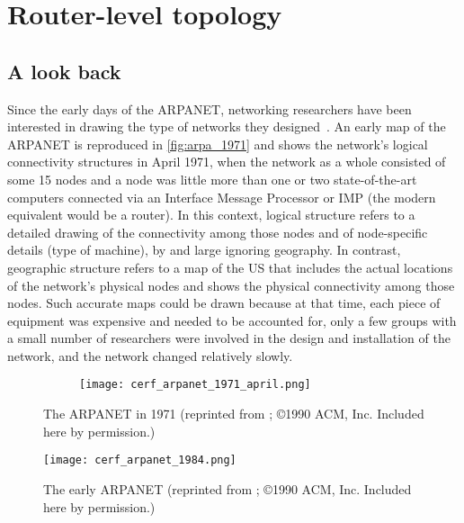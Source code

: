 \section{Router-level topology}
\label{sec:router}

\subsection{A look back}
\label{sec:router_hist}

Since the early days of the ARPANET, networking researchers have been
interested in drawing the type of networks they
designed~\cite{heart78:_arpanet}.  An early map of the ARPANET is
reproduced in \autoref{fig:arpa_1971} and shows the network's logical
connectivity structures in April 1971, when the network as a whole
consisted of some 15 nodes and a node was little more than one or two
state-of-the-art computers connected via an Interface Message
Processor or IMP (the modern equivalent would be a router).  In this
context, logical structure refers to a detailed drawing of the
connectivity among those nodes and of node-specific details (\eg type
of machine), by and large ignoring geography.  In contrast, geographic
structure refers to a map of the US that includes the actual locations
of the network's physical nodes and shows the physical connectivity
among those nodes. Such accurate maps could be drawn because at that
time, each piece of equipment was expensive and needed to be accounted
for, only a few groups with a small number of researchers were
involved in the design and installation of the network, and the
network changed relatively slowly.

\begin{figure}[thbp]
  \begin{center}
    \begin{subfigure}[b]{0.75\textwidth} \centering
      \texttt{[image: cerf\_arpanet\_1971\_april.png]}
    \end{subfigure}
    \caption{The ARPANET in 1971 (reprinted from
      \cite{cerf90:_selected_maps}; \copyright 1990 ACM, Inc. Included here by permission.)
      \label{fig:arpa_1971}}
  \end{center}
\end{figure}


\begin{figure}[thbp]
  \begin{center}
    \texttt{[image: cerf\_arpanet\_1984.png]}
    \caption{The early ARPANET  (reprinted from
      \cite{cerf90:_selected_maps}; \copyright 1990 ACM, Inc. Included here by permission.)
      \label{fig:arpa_1984}}
  \end{center}
\end{figure}

